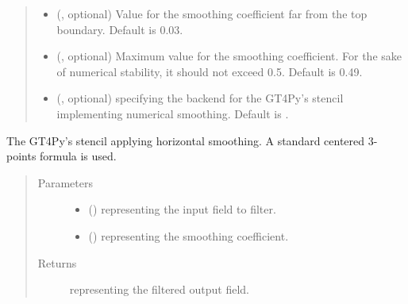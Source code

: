 \documentclass[letterpaper,10pt,english]{sphinxmanual}
\begin{document}
\begin{fulllineitems}
\begin{fulllineitems}
\begin{quote}
\begin{description}
\begin{itemize}
\item {} 
 (, optional) \textendash{} Value for the smoothing coefficient far from the top boundary. Default is 0.03.

\item {} 
 (, optional) \textendash{} Maximum value for the smoothing coefficient. For the sake of numerical stability, it should not
exceed 0.5. Default is 0.49.

\item {} 
 (, optional) \textendash{}  specifying the backend for the GT4Py’s stencil implementing numerical
smoothing. Default is .

\end{itemize}

\end{description}\end{quote}

\end{fulllineitems}


\begin{fulllineitems}
\label{\detokenize{api:dycore.horizontal_smoothing.HorizontalSmoothingFirstOrderXZ._stencil_defs}}
The GT4Py’s stencil applying horizontal smoothing. A standard centered 3-points formula is used.
\begin{quote}\begin{description}
\item[{Parameters}] \leavevmode\begin{itemize}
\item {} 
 () \textendash{}  representing the input field to filter.

\item {} 
 () \textendash{}  representing the smoothing coefficient.

\end{itemize}

\item[{Returns}] \leavevmode
{} representing the filtered output field.


\end{description}
\end{quote}
\end{fulllineitems}
\end{fulllineitems}
\end{document}
